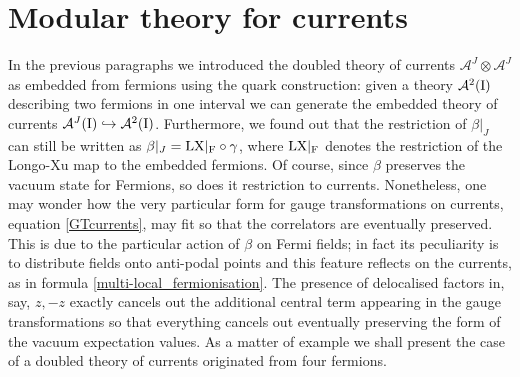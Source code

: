  \section{Modular theory for currents}
 \label{Modular theory for currents}
 In the previous paragraphs we introduced the doubled 
 theory of currents $\mathcal{A}^J\otimes\mathcal{A}^J$
 as embedded from fermions using the 
 quark construction: given a theory $\mathcal{A}^2(\textrm{I})$
 describing two fermions in one interval we can generate
 the embedded theory of currents $\mathcal{A}^J(\textrm{I})
 \hookrightarrow\mathcal{A}^2(\textrm{I})$. 
 Furthermore, we found out that the 
 restriction of $\beta|_J$ can still be written as 
 $\beta|_J=\textrm{LX}|_{\textrm{F}}\circ\gamma$, where 
 $\textrm{LX}|_{\textrm{F}}$ denotes the restriction of the 
 Longo-Xu map to the embedded fermions. Of course, 
 since $\beta$ preserves the vacuum state for Fermions,
 so does it restriction to currents. Nonetheless, one may 
 wonder how the very particular form for gauge transformations
 on currents, equation \eqref{GTcurrents}, may fit so that
 the correlators are eventually preserved. This is due to 
 the particular action of $\beta$ on Fermi fields; in fact
 its peculiarity is to distribute fields onto anti-podal 
 points and this feature reflects on the currents, as 
 in formula \eqref{multi-local_fermionisation}. The 
 presence of delocalised factors in, say, $z,-z$ exactly
 cancels out the additional central term appearing in the 
 gauge transformations so that everything cancels out 
 eventually preserving the form of the vacuum expectation
 values. As a matter of example we shall present the case 
 of a doubled theory of currents originated from four 
 fermions.
